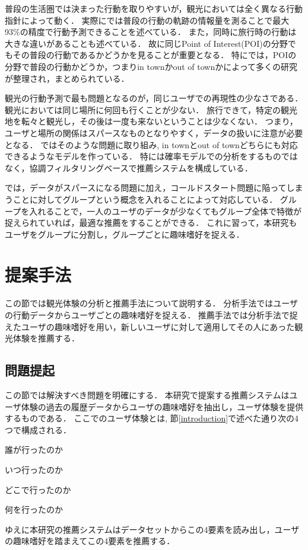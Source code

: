 \documentclass[a4j,10pt, twocolumn]{jarticle}
\begin{document}
普段の生活圏では決まった行動を取りやすいが，観光においては全く異なる行動指針によって動く．
実際に\cite{song2010limits}では普段の行動の軌跡の情報量を測ることで最大93\%の精度で行動予測できることを述べている．
また，同時に旅行時の行動は大きな違いがあることも述べている．
故に同じPoint of Interest(POI)の分野でもその普段の行動であるかどうかを見ることが重要となる．
特に\cite{liu2017experimental}では，POIの分野で普段の行動かどうか，つまりin townかout of townかによって多くの研究が整理され，まとめられている．

観光の行動予測で最も問題となるのが，同じユーザでの再現性の少なさである．
観光においては同じ場所に何回も行くことが少ない．
旅行できて，特定の観光地を転々と観光し，その後は一度も来ないということは少なくない．
つまり，ユーザと場所の関係はスパースなものとなりやすく，データの扱いに注意が必要となる．
\cite{ference2013location}\cite{yin2013lcars}\cite{wang2015geo}\cite{yin2016joint}ではそのような問題に取り組み, in townとout of townどちらにも対応できるようなモデルを作っている．
特に\cite{ference2013location}は確率モデルでの分析をするものではなく，協調フィルタリングベースで推薦システムを構成している．

\cite{wang2015geo}\cite{zhuang2017sns}\cite{馬強2017観光情報学の最前線}\cite{馬強2019観光の分散化と個人化の実現に向けたユーザ生成コンテンツの分析と利活用技術について}では，データがスパースになる問題に加え，コールドスタート問題に陥ってしまうことに対してグループという概念を入れることによって対応している．
グループを入れることで，一人のユーザのデータが少なくてもグループ全体で特徴が捉えられていれば，最適な推薦をすることができる．
これに習って，本研究もユーザをグループに分割し，グループごとに趣味嗜好を捉える．

\section{提案手法} \label{proposed_method}
この節では観光体験の分析と推薦手法について説明する．
分析手法ではユーザの行動データからユーザごとの趣味嗜好を捉える．
推薦手法では分析手法で捉えたユーザの趣味嗜好を用い，新しいユーザに対して適用してその人にあった観光体験を推薦する．

\subsection{問題提起} \label{def}
この節では解決すべき問題を明確にする．
本研究で提案する推薦システムはユーザ体験の過去の履歴データからユーザの趣味嗜好を抽出し，ユーザ体験を提供するものである．
ここでのユーザ体験とは, 節\ref{introduction}で述べた通り次の4つで構成される．
\begin{description}
  \setlength{\leftskip}{.5cm}
  \item[\textbf{Who}] 誰が行ったのか
  \item[\textbf{When}] いつ行ったのか
  \item[\textbf{Where}] どこで行ったのか
  \item[\textbf{What}] 何を行ったのか
\end{description}
ゆえに本研究の推薦システムはデータセットからこの4要素を読み出し，ユーザの趣味嗜好を踏まえてこの4要素を推薦する．
\end{document}
